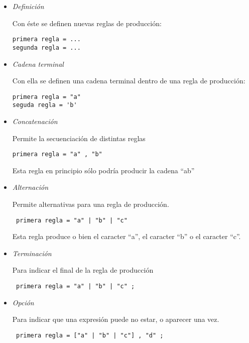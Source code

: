\documentclass[12pt]{article}
\begin{document}
\begin{itemize}
\item \textit{Definición}

  Con éste se definen nuevas reglas de producción:

\begin{verbatim}
primera regla = ...
segunda regla = ...
\end{verbatim}

\item \textit{Cadena terminal}

  Con ella se definen una cadena terminal dentro de una regla de producción:

\begin{verbatim}
primera regla = "a"
seguda regla = 'b'
\end{verbatim}

\item \textit{Concatenación}

  Permite la secuenciación de distintas reglas
  
\begin{verbatim}
primera regla = "a" , "b"
\end{verbatim}

Esta regla en principio sólo podría producir la cadena ``ab''

\item \textit{Alternación}

  Permite alternativas para una regla de producción.

\begin{verbatim}
 primera regla = "a" | "b" | "c"
\end{verbatim}

Esta regla produce o bien el caracter ``a'', el caracter ``b'' o el caracter ``c''.

\item \textit{Terminación}

  Para indicar el final de la regla de producción

\begin{verbatim}
 primera regla = "a" | "b" | "c" ;
\end{verbatim}

\item \textit{Opción}

  Para indicar que una expresión puede no estar, o aparecer una vez.

\begin{verbatim}
 primera regla = ["a" | "b" | "c"] , "d" ;
\end{verbatim}


\end{itemize}
\end{document}
